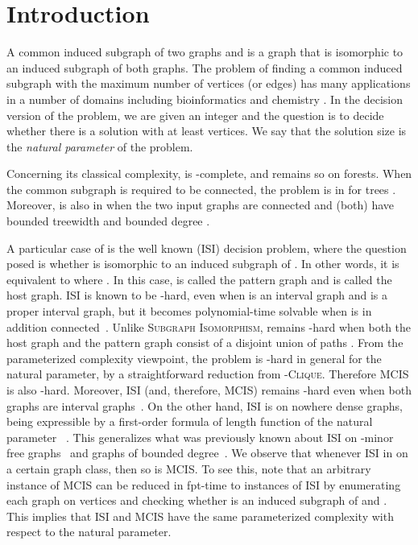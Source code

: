 




\section{Introduction}
\label{intro}

A common induced subgraph of two graphs  and  is a graph that is isomorphic to an induced subgraph of both graphs.
The problem of finding a common induced subgraph with the maximum number of vertices (or edges) has many applications in a number of domains including bioinformatics and chemistry \cite{Grindley1993,Koch1996,MW81,RW02,Yamaguchi2004}. 
In the decision version of the problem, we are given an integer  and the question is to decide whether there is a solution with at least  vertices.
We say that the solution size  is the \emph{natural parameter} of the 
problem. 

Concerning its classical complexity, \mcis is -complete, and remains so 
on forests. When the common subgraph is required to be connected, the problem 
is in  for trees \cite{Garey1979}.
Moreover, \mcis is also in  when the two input graphs are connected and 
(both) have bounded treewidth and bounded degree \cite{Akutsu1993}. 

A particular case of \mcis is the well known \isi (ISI) decision problem, where the question posed is whether  is isomorphic to an induced 
subgraph of .
In other words, it is equivalent to \mcis where .
In this case,  is called the pattern graph and  is called the host 
graph.
ISI is known to be -hard, even when  is an interval graph and  
is a proper interval graph, but it becomes polynomial-time solvable when  
is in addition connected~\cite{Heggernes}. 
Unlike \textsc{Subgraph Isomorphism}, \isi remains -hard when both
the host graph and the pattern graph consist of a disjoint union of 
paths \cite{Damaschke1991}. 
From the parameterized complexity viewpoint, the problem is -hard in 
general for the natural parameter, by a straightforward reduction 
from \textsc{-Clique}. Therefore MCIS is also -hard. 
Moreover, ISI (and, therefore, MCIS) remains -hard even when both 
graphs are interval graphs~\cite{MarxS13}. 
On the other hand, ISI is  on nowhere dense 
graphs, being expressible by a first-order formula of length
function of the natural parameter ~\cite{GroheKS14}.
This generalizes what was previously known about ISI on 
-minor free graphs~\cite{FG01} 
and graphs of bounded degree~\cite{Cai2006}. 
We observe that whenever ISI in  on a certain graph class, then so 
is MCIS. 
To see this, note that an arbitrary instance  of MCIS can be 
reduced in fpt-time to instances of ISI by enumerating each graph  on 
 vertices and checking whether  is an induced subgraph of  and .
This implies that ISI and MCIS have the same parameterized complexity with 
respect to the natural parameter.  

